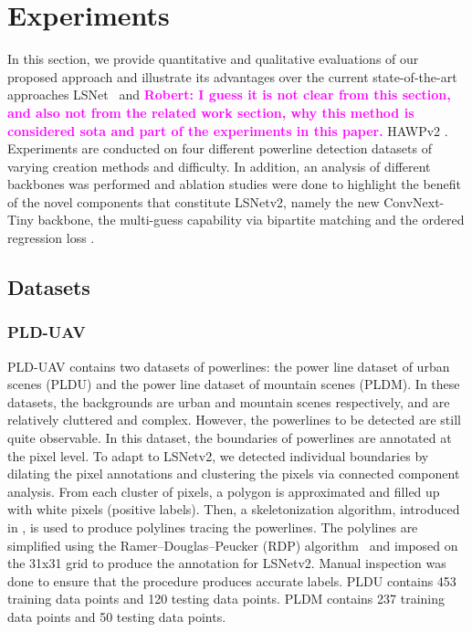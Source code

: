 \documentclass[journal]{IEEEtran}
\newcommand{\commentM}[1]{\textbf{\textcolor{blue}{M: #1}}}
\newcommand{\commentR}[1]{\textbf{\textcolor{magenta}{Robert: #1}}}
\begin{document}
\section{Experiments}
In this section, we provide quantitative and qualitative evaluations of our proposed approach and illustrate its advantages over the current state-of-the-art approaches LSNet~\cite{Nguyen2020} and \commentR{I guess it is not clear from this section, and also not from the related work section, why this method is considered sota and part of the experiments in this paper.} HAWPv2 \cite{hawpv2}. Experiments are conducted on four different powerline detection datasets of varying creation methods and difficulty. In addition, an analysis of different backbones was performed and ablation studies were done to highlight the benefit of the novel components that constitute LSNetv2, namely the new ConvNext-Tiny backbone, the multi-guess capability via bipartite matching and the ordered regression loss .

\subsection{Datasets}

\subsubsection{PLD-UAV}

PLD-UAV \cite{PLD_UAV} contains two datasets of powerlines: the power line dataset of urban scenes (PLDU) and the power line dataset of mountain scenes (PLDM). In these datasets, the backgrounds are urban and mountain scenes respectively, and are relatively cluttered and complex. However, the powerlines to be detected are still quite observable. In this dataset, the boundaries of powerlines are annotated at the pixel level. To adapt to LSNetv2, we detected individual boundaries by dilating the pixel annotations and clustering the pixels via connected component analysis. From each cluster of pixels, a polygon is approximated and filled up with white pixels (positive labels). Then, a skeletonization algorithm, introduced in \cite{skeleton}, is used to produce polylines tracing the powerlines. The polylines are simplified using the Ramer–Douglas–Peucker (RDP) algorithm~\cite{RDP} and imposed on the 31x31 grid to produce the annotation for LSNetv2. Manual inspection was done to ensure that the procedure produces accurate labels. PLDU contains 453 training data points and 120 testing data points. PLDM contains 237 training data points and 50 testing data points.
\end{document}
